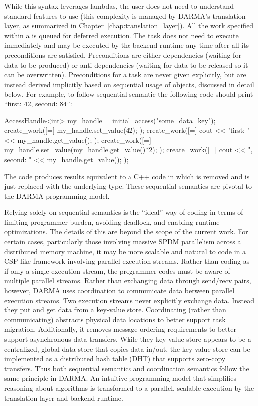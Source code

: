 While this syntax leverages  lambdas, the user does not need to understand  standard features to use  (this
complexity is managed by DARMA's translation layer, as summarized in Chapter~\ref{chap:translation_layer}). 
All the work specified within a  is queued for deferred execution. 
The task does not need to execute immediately and may be executed by the backend runtime any time after all its preconditions are satisfied. 
Preconditions are either dependencies (waiting for data to be produced) or anti-dependencies (waiting for data to be released so it can be overwritten).   
Preconditions for a task are never given explicitly, but are instead derived implicitly based on sequential usage of  objects, discussed in detail below.
For example, to follow sequential semantic the following code should print ``first: 42, second: 84'':
\begin{CppCode}
AccessHandle<int> my_handle = initial_access("some_data_key");
create_work([=]{
  my_handle.set_value(42);
});
create_work([=]{
  cout << "first: " << my_handle.get_value();
});
create_work([=]{
  my_handle.set_value(my_handle.get_value()*2);
});
create_work([=]{
  cout << ", second: " << my_handle.get_value();
});
\end{CppCode}
The code produces results equivalent to a C++ code in which  is removed and  is just replaced with the underlying type.
These sequential semantics are pivotal to the DARMA programming model.

Relying solely on sequential semantics is the ``ideal'' way of coding in terms of limiting programmer burden, avoiding deadlock, and enabling runtime optimizations.
The details of this are beyond the scope of the current work.
For certain cases, particularly those involving massive SPDM parallelism across a distributed memory machine,
it may be more scalable and natural to code in a CSP-like framework involving parallel execution streams.
Rather than coding as if only a single execution stream, the programmer codes must be aware of multiple parallel streams.
Rather than exchanging data through send/recv pairs, however, DARMA uses coordination to communicate data between parallel execution streams.
Two execution streams never explicitly exchange data. Instead they put and get data from a key-value store.
Coordinating (rather than communicating) abstracts physical data locations to better support task migration.
Additionally, it removes message-ordering requirements to better support asynchronous data transfers.
While they key-value store appears to be a centralized, global data store that copies data in/out,
the key-value store can be implemented as a distributed hash table (DHT) that supports zero-copy transfers.
Thus both sequential semantics and coordination semantics follow the same principle in DARMA.
An intuitive programming model that simplifies reasoning about algorithms is transformed to a parallel, scalable execution by the translation layer and backend runtime.

